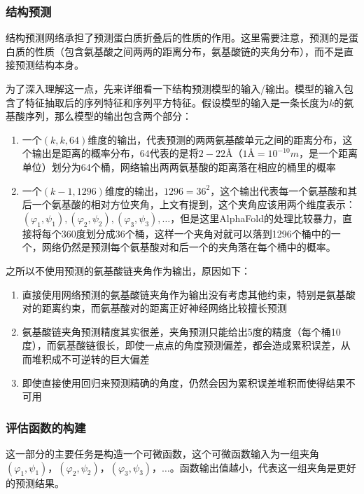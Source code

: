 \documentclass[withoutpreface,bwprint]{cumcmthesis}
\begin{document}
\subsubsection{结构预测}

结构预测网络承担了预测蛋白质折叠后的性质的作用。这里需要注意，预测的是蛋白质的性质（包含氨基酸之间两两的距离分布，氨基酸链的夹角分布），而不是直接预测结构本身。

为了深入理解这一点，先来详细看一下结构预测模型的输入/输出。模型的输入包含了特征抽取后的序列特征和序列平方特征。假设模型的输入是一条长度为$k$的氨基酸序列，那么模型的输出包含两个部分：

\begin{enumerate}
    \item 一个$(k,k,64)$维度的输出，代表预测的两两氨基酸单元之间的距离分布，这个输出是距离的概率分布，$64$代表的是将$2-22Å$（$1Å=10^{-10}m$，是一个距离单位）划分为64个桶，网络输出两两氨基酸的距离落在相应的桶里的概率
    \item 一个$(k-1,1296)$维度的输出，$1296 = 36^2$，这个输出代表每一个氨基酸和其后一个氨基酸的相对方位夹角，上文有提到，这个夹角应该用两个维度表示：$(\varphi_1,\psi_1),(\varphi_2,\psi_2),(\varphi_3,\psi_3),\dots$，但是这里AlphaFold的处理比较暴力，直接将每个360度划分成36个桶，这样一个夹角对就可以落到1296个桶中的一个，网络仍然是预测每个氨基酸对和后一个的夹角落在每个桶中的概率。
\end{enumerate}

之所以不使用预测的氨基酸链夹角作为输出，原因如下：
\begin{enumerate}
    \item 直接使用网络预测的氨基酸链夹角作为输出没有考虑其他约束，特别是氨基酸对的距离约束，而氨基酸对的距离正好神经网络比较擅长预测
    \item 氨基酸链夹角预测精度其实很差，夹角预测只能给出5度的精度（每个桶10度），而氨基酸链很长，即使一点点的角度预测偏差，都会造成累积误差，从而堆积成不可逆转的巨大偏差
    \item 即使直接使用回归来预测精确的角度，仍然会因为累积误差堆积而使得结果不可用
\end{enumerate}

\subsubsection{评估函数的构建}

这一部分的主要任务是构造一个可微函数，这个可微函数输入为一组夹角$(\varphi_1,\psi_1)$，$(\varphi_2,\psi_2)$，$(\varphi_3,\psi_3)$，$\dots$。函数输出值越小，代表这一组夹角是更好的预测结果。
\end{document}
